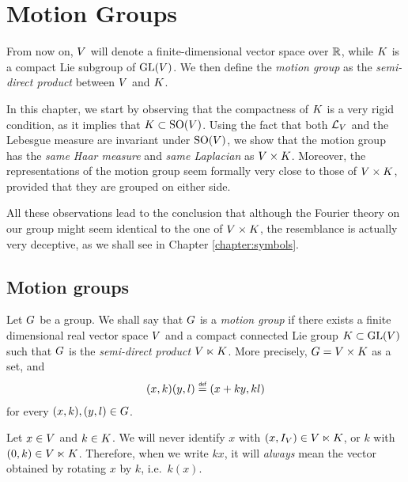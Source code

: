 \chapter{Motion Groups}

From now on,
$\VectorSpace$ will denote a finite-dimensional vector space over $\R$,
while $\CompactGroup$ is a compact Lie subgroup of $\GeneralLinear\VectorSpace$.
We then define the \emph{motion group} as the \emph{semi-direct product} between $\VectorSpace$ and $\CompactGroup$.

In this chapter,
we start by observing that the compactness of $\CompactGroup$ is a very rigid condition,
as it implies that $\CompactGroup \subset \SpecialOrthogonalGroup \VectorSpace$.
Using the fact that both $\Laplacian [\VectorSpace]$ and the Lebesgue measure are invariant under $\SpecialOrthogonalGroup \VectorSpace$,
we show that the motion group has the \emph{same Haar measure} and \emph{same Laplacian} as $\GroupDirect$.
Moreover,
the representations of the motion group seem formally very close to those of $\GroupDirect$, provided that they are grouped on either side.

All these observations lead to the conclusion
that although the Fourier theory on our group might seem identical to the one of $\GroupDirect$,
the resemblance is actually very deceptive,
as we shall see in Chapter \ref{chapter:symbols}.

\section{Motion groups}

\begin{definition}
\label{definition:motion_group}
    Let $\Group$ be a group.
    We shall say that $\Group$ is a \emph{motion group}
    if there exists a finite dimensional real vector space $\VectorSpace$
    and a compact connected Lie group $\CompactGroup \subset \GeneralLinear\VectorSpace$
    such that $\Group$ is the \emph{semi-direct product} $\VectorSpace \ltimes \CompactGroup$.
    More precisely, $\Group = \VectorSpace \times \CompactGroup$ as a set, and
    \begin{align*}
        (x, k) (y, l) \defeq (x + ky, k l)
    \end{align*}
    for every $(x, k), (y, l) \in \Group$.
\end{definition}

\begin{remark}
\label{remark:notation_kx}
    Let $x \in \VectorSpace$ and $k \in \CompactGroup$.
    We will never identify $x$ with $(x, \Id{\VectorSpace}) \in \VectorSpace \ltimes \CompactGroup$,
    or $k$ with $(0, k) \in \VectorSpace \ltimes \CompactGroup$.
    Therefore, when we write $k x$, it will \emph{always} mean the vector obtained by rotating $x$ by $k$, i.e.\ $k(x)$.
\end{remark}

